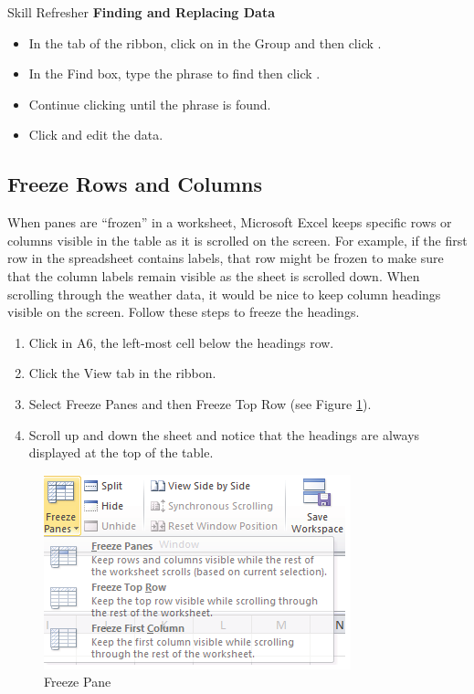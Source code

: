 \begin{center}
	\begin{sklbox}{Skill Refresher}
		\textbf{Finding and Replacing Data}
		\\
		\begin{itemize}
			\setlength{\itemsep}{0pt}
			\setlength{\parskip}{0pt}
			\setlength{\parsep}{0pt}

			\item In the  tab of the ribbon, click on  in the  Group and then click .
			\item In the Find box, type the phrase to find then click .
			\item Continue clicking  until the phrase is found.
			\item Click  and edit the data.
			
		\end{itemize}
	\end{sklbox}
\end{center}

\subsection{Freeze Rows and Columns}

When panes are ``frozen'' in a worksheet, Microsoft Excel keeps specific rows or columns visible in the table as it is scrolled on the screen. For example, if the first row in the spreadsheet contains labels, that row might be frozen to make sure that the column labels remain visible as the sheet is scrolled down. When scrolling through the weather data, it would be nice to keep column headings visible on the screen. Follow these steps to freeze the headings.

\begin{enumerate}
	\item Click in \textsf{A6}, the left-most cell below the headings row.
	\item Click the View tab in the ribbon.
	\item Select Freeze Panes and then Freeze Top Row (see Figure \ref{05:fig07}).
	\item Scroll up and down the sheet and notice that the headings are always displayed at the top of the table.
\end{enumerate}

\begin{figure}[H]
	\centering
	\includegraphics[width=\maxwidth{.95\linewidth}]{gfx/ch05_fig07}
	\caption{Freeze Pane}
	\label{05:fig07}
\end{figure}

